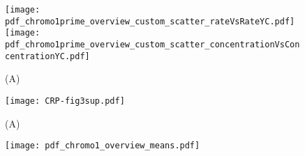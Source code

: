 \begin{figure}
	\centering
	\texttt{[image: pdf\_chromo1prime\_overview\_custom\_scatter\_rateVsRateYC.pdf]}
	\texttt{[image: pdf\_chromo1prime\_overview\_custom\_scatter\_concentrationVsConcentrationYC.pdf]}
	\caption{ 
		(A) 
	}
	\label{fig:CRP:fig3}
\end{figure}


\begin{figure}
	\centering
	\texttt{[image: CRP-fig3sup.pdf]}
	\caption{ 
		(A) 
	}
	\label{fig:CRP:fig3}
\end{figure}





\begin{figure}
	\centering
	\texttt{[image: pdf\_chromo1\_overview\_means.pdf]}
	\clearpage %
	\label{fig:XXX:XXX}
\end{figure}	


